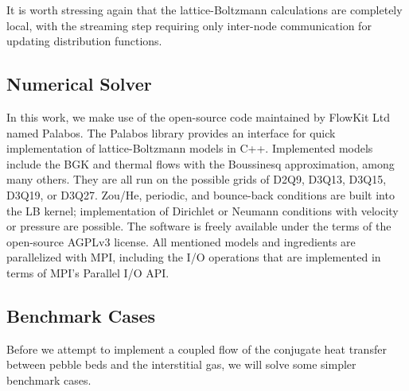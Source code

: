 It is worth stressing again that the lattice-Boltzmann calculations are completely local, with the streaming step requiring only inter-node communication for updating distribution functions. 

\subsection{Numerical Solver}

In this work, we make use of the open-source code maintained by FlowKit Ltd named Palabos.\cite{Flow} The Palabos library provides an interface for quick implementation of lattice-Boltzmann models in C++. Implemented models include the BGK and thermal flows with the Boussinesq approximation, among many others. They are all run on the possible grids of D2Q9, D3Q13, D3Q15, D3Q19, or D3Q27. Zou/He, periodic, and bounce-back conditions are built into the LB kernel; implementation of Dirichlet or Neumann conditions with velocity or pressure are possible. The software is freely available under the terms of the open-source AGPLv3 license.\cite{FreeSoftwareFoundationInc.2007} All mentioned models and ingredients are parallelized with MPI, including the I/O operations that are implemented in terms of MPI’s Parallel I/O API.

\subsection{Benchmark Cases}
Before we attempt to implement a coupled flow of the conjugate heat transfer between pebble beds and the interstitial gas, we will solve some simpler benchmark cases.